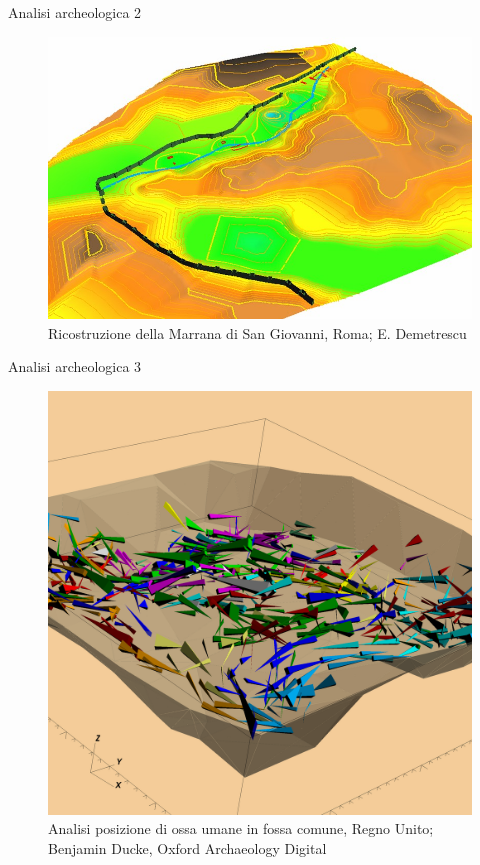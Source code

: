 \documentclass{beamer}
\begin{document}
		\begin{frame}{Analisi archeologica 2}
			\begin{figure}[]
				\begin{center}
					\includegraphics[width=1\linewidth]{demetr}
				\end{center}
				\caption{Ricostruzione della Marrana di San Giovanni, Roma; E. Demetrescu}
				\label{fig:demetr}
			\end{figure}
		\end{frame}

		\begin{frame}{Analisi archeologica 3}
			\begin{figure}[]
				\begin{center}
					\includegraphics[width=0.65\linewidth]{oa}
				\end{center}
				\caption{Analisi posizione di ossa umane in fossa comune, Regno Unito; Benjamin Ducke, Oxford Archaeology Digital}
				\label{fig:oa}
			\end{figure}
		\end{frame}
\end{document}
